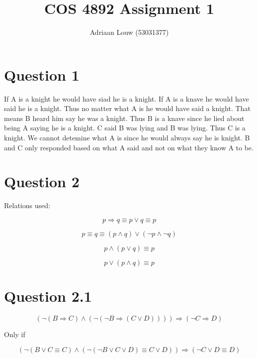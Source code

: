 \documentclass[10pt,a4paper]{article}
\title{COS 4892 Assignment 1}
\author{Adriaan Louw (53031377)}
\begin{document}
\maketitle

\section{Question 1}

If A is a knight he would have siad he is a knight. If A is a knave he would have said he is a knight. Thus no matter what A is he would have said a knight. That means B heard him say he was a knight. Thus B is a knave since he lied about being A saying he is a knight. C said B was lying and B was lying. Thus C is a knight. We cannot detemine what A is since he would always say he is knight. B and C only responded based on what A said and not on what they know A to be.

\section{Question 2}
Relations used:

\begin{equation}
 p \Rightarrow q \equiv p \vee q \equiv p
 \label{onlyif}
\end{equation}

\begin{equation}
 p \equiv q \equiv ( p \wedge q) \vee (\neg p \wedge \neg q)
 \label{DNF}
\end{equation}

\begin{equation}
 p \wedge ( p \vee q) \equiv p
 \label{absorbtion1}
\end{equation}

\begin{equation}
 p \vee ( p \wedge q) \equiv p
 \label{absorbtion2}
\end{equation}

\section{Question 2.1}

\begin{equation}
 (\neg (B \Rightarrow C)\wedge (\neg(\neg B \Rightarrow(C\vee D)))) \Rightarrow (\neg C \Rightarrow D)
\end{equation}

Only if

\begin{equation}
 (\neg(B\vee C \equiv C)\wedge(\neg(\neg B\vee C\vee D) \equiv C \vee D)) \Rightarrow (\neg C \vee D \equiv D)
\end{equation}
\end{document}

